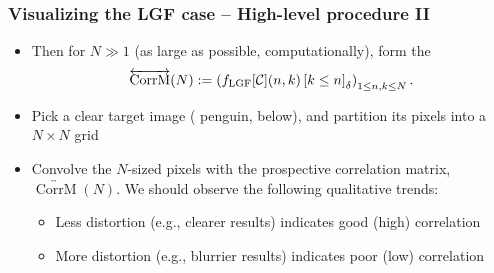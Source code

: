 \begin{frame}
\frametitle{Visualizing the LGF case -- High-level procedure II}
\begin{itemize} 

\item Then for $N \gg 1$ (as large as possible, computationally), form the  
      \[
      \overleftrightarrow{\operatorname{CorrM}}(N) := 
		\left(f_{\operatorname{LGF}}[\mathcal{C}](n, k) \left[k \leq n\right]_{\delta}\right)_{1 \leq n,k \leq N}. 
      \]
\pause\item Pick a clear target image ( penguin, below), and partition its pixels into a $N \times N$ grid
\pause\item Convolve the $N$-sized pixels with the prospective correlation matrix, 
      $\overleftrightarrow{\operatorname{CorrM}}(N)$. 
      We should observe the following qualitative trends:
      \begin{itemize}
      \item Less distortion (e.g., clearer results) indicates good (high) correlation 
      \pause\item More distortion (e.g., blurrier results) indicates poor (low) correlation 
      \end{itemize}

\end{itemize}

\end{frame}

